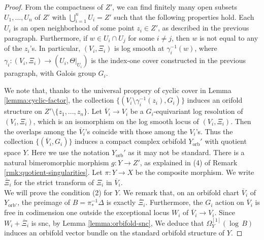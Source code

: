 \documentclass[12pt]{amsart}
\newcommand{\<}{\leq}
\newcommand{\D}{\Delta}
\theoremstyle{remark}
\theoremstyle{definition}
\theoremstyle{definition}
\numberwithin{equation}{section}
\theoremstyle{definition}
\theoremstyle{definition}
\def\orb{\mathrm{orb}}
\begin{document}
\begin{proof}
From the compactness of $Z'$, 
we can find finitely many open subsets $U_1,...,U_n$ of $Z'$ with $\bigcup_{i=1}^n U_i =Z'$ such that the following properties hold. 
Each $U_i$ is an open neighborhood of some point $z_i\in Z'$, as described   in the previous paragraph.  
Furthermore, if $w \in U_i\cap U_j$ for some $i\neq j$, then $w$ is not equal to any of the $z_i$'s. 
In particular,   $(V_i,\Xi_i)$ is log smooth at $\gamma_i^{-1}(w)$, where $\gamma_i \colon (V_i, \Xi_i )\to (U_i, \Theta|_{U_i})$ is the index-one cover constructed in the previous paragraph, with Galois group $G_i$.  


We note that,  thanks to the universal proppery of cyclic cover in Lemma \ref{lemma:cyclic-factor}, the collection  $\{ (V_i \setminus \gamma_i^{-1}(z_i), G_i )\}$ induces an orifold structure on $Z'\setminus \{z_1,...,z_n\}$.  
Let $\overline{V}_i \to V_i$ be a $G_i$-equivariant log resolution of $(V_i,\Xi_i)$,  which is an isomorphism on the log smooth locus of $(V_i,\Xi_i)$.  
Then the overlaps among the $\overline{V}_i$'s coincide with those among the $V_i$'s.  
Thus  the collection  $\{(\overline{V}_i,G_i)\}$  induces a compact complex orbifold $Y_{\orb}'$ with quotient space $Y$.  
Here we use the notation $Y_{\orb}'$ as it may not be standard.
There is a natural bimeromorphic morphism $g\colon Y  \to Z'$, as explained in (4) of Remark \ref{rmk:quotient-singularities}.
Let $\pi \colon Y\to X$    be the composite morphism.  
We write $\overline{\Xi}_i$ for the strict transform of $\Xi_i$ in $\overline{V}_i$. 
\\

We will prove the condition (2) for $Y$.  
We remark that, on an orbifold chart $\overline{V}_i$ of $Y_{\orb'}$, the preimage of $B=\pi_*^{-1}\D$ is exactly $\overline{\Xi}_i$.
Furthermore, the $G_i$ action on $\overline{V}_i$ is free in codimension one outside the exceptional locus $W_i$ of $\overline{V}_i \to V_i$. 
Since $W_i+\overline{\Xi}_i$ is snc, by Lemma \ref{lemma:orbifold-snc}, 
We deduce  that  $\Omega_Y^{[1]}(\log\, B)$ induces an orbifold vector bundle on the standard orbifold structure of  $Y$. 
 



\end{proof}
\end{document}

